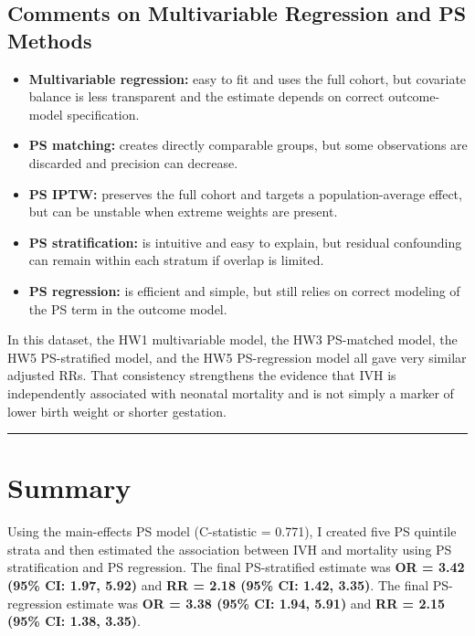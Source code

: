 \documentclass[
]{article}
\providecommand{\tightlist}{%
  \setlength{\itemsep}{0pt}\setlength{\parskip}{0pt}}
\begin{document}
\hypertarget{comments-on-multivariable-regression-and-ps-methods}{%
\subsection{Comments on Multivariable Regression and PS
Methods}\label{comments-on-multivariable-regression-and-ps-methods}}

\begin{itemize}
\tightlist
\item
  \textbf{Multivariable regression:} easy to fit and uses the full
  cohort, but covariate balance is less transparent and the estimate
  depends on correct outcome-model specification.
\item
  \textbf{PS matching:} creates directly comparable groups, but some
  observations are discarded and precision can decrease.
\item
  \textbf{PS IPTW:} preserves the full cohort and targets a
  population-average effect, but can be unstable when extreme weights
  are present.
\item
  \textbf{PS stratification:} is intuitive and easy to explain, but
  residual confounding can remain within each stratum if overlap is
  limited.
\item
  \textbf{PS regression:} is efficient and simple, but still relies on
  correct modeling of the PS term in the outcome model.
\end{itemize}

In this dataset, the HW1 multivariable model, the HW3 PS-matched model,
the HW5 PS-stratified model, and the HW5 PS-regression model all gave
very similar adjusted RRs. That consistency strengthens the evidence
that IVH is independently associated with neonatal mortality and is not
simply a marker of lower birth weight or shorter gestation.

\begin{center}\rule{0.5\linewidth}{0.5pt}\end{center}

\hypertarget{summary}{%
\section{Summary}\label{summary}}

Using the main-effects PS model (C-statistic = 0.771), I created five PS
quintile strata and then estimated the association between IVH and
mortality using PS stratification and PS regression. The final
PS-stratified estimate was \textbf{OR = 3.42 (95\% CI: 1.97, 5.92)} and
\textbf{RR = 2.18 (95\% CI: 1.42, 3.35)}. The final PS-regression
estimate was \textbf{OR = 3.38 (95\% CI: 1.94, 5.91)} and \textbf{RR =
2.15 (95\% CI: 1.38, 3.35)}.
\end{document}
